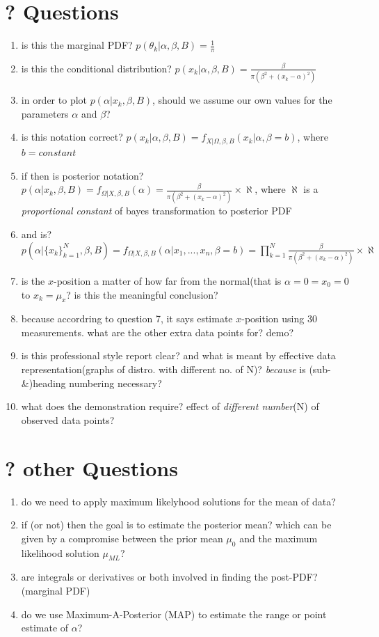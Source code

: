 \documentclass[a4paper,11pt]{article}
\begin{document}
\section{? Questions}
	\begin{enumerate}

		\item is this the marginal PDF? $p(\theta_k | \alpha, \beta, B) = \frac{1}{\pi}$
		\item is this the conditional distribution? $p(x_k | \alpha, \beta, B) = \frac{\beta}{\pi (\beta^2 + (x_k - \alpha)^2)}$
		\item in order to plot $p(\alpha | x_k, \beta, B)$, should we assume our own values for the parameters $\alpha$ and $\beta$?
		\item is this notation correct? $ p(x_k | \alpha, \beta, B) = f_{X | \Omega, \beta, B}(x_k | \alpha, \beta = b)$, where $b = constant$
		\item if then is posterior notation? $p(\alpha | x_k, \beta, B) = f_{\Omega | X, \beta, B}(\alpha) = \frac{\beta}{\pi (\beta^2 + (x_k - \alpha)^2)} \times \aleph$, where $\aleph$ is a \emph{proportional constant} of bayes transformation to posterior PDF
		\item and is? $p(\alpha | \{x_k\}^N _{k = 1}, \beta, B) = f_{\Omega | X, \beta, B}(\alpha | x_1,...,x_n, \beta = b ) = \prod^N _{k = 1} \frac{\beta}{\pi (\beta^2 + (x_k - \alpha)^2)} \times \aleph $
		\item is the $x$-position a matter of how far from the normal(that is $\alpha = 0 = x_0 = 0$ to $x_k = \mu_x$? is this the meaningful conclusion?
		\item because accordring to question 7, it says estimate $x$-position using 30 measurements. what are the other extra data points for? demo?  
		\item is this professional style report clear? and what is meant by effective data representation(graphs of distro. with different no. of N)? \emph{because} is (sub-\&)heading numbering necessary?		
		\item what does the demonstration require? effect of \emph{different number}(N) of observed data points?
		
	\end{enumerate}
	
\section{? other Questions}
	\begin{enumerate}
		\item do we need to apply maximum likelyhood solutions for the mean of data?
		\item if (or not) then the goal is to estimate the posterior mean? which can be given by a compromise between the prior mean $\mu_0$ and the maximum likelihood solution $\mu_{ML}$?
		\item are integrals or derivatives or both involved in finding the post-PDF? (marginal PDF)
		\item do we use Maximum-A-Posterior (MAP) to estimate the range or point estimate of $\alpha$?
	\end{enumerate}
\end{document}
